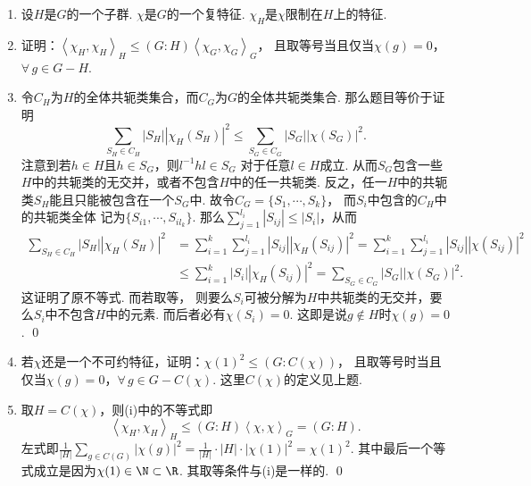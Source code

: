 \begin{enumerate}
        \item[11.8] 设$H$是$G$的一个子群. $\chi$是$G$的一个复特征.
        $\chi_{H}$是$\chi$限制在$H$上的特征.
        \item[(i)] 证明：$\left<\chi_{H},\chi_{H}\right>_{H} 
            \leq (G:H)\left<\chi_{G},\chi_{G}\right>_{G}$，
            且取等号当且仅当$\chi(g)=0$，$\forall \, g \in G-H$.
        \item[\textbf{证明:}]
            令$C_{H}$为$H$的全体共轭类集合，而$C_{G}$为$G$的全体共轭类集合.
            那么题目等价于证明
            \[\sum_{S_{H} \in C_{H}}|S_{H}||\chi_{H}(S_{H})|^{2} 
            \leq \sum_{S_{G} \in C_{G}}|S_{G}||\chi(S_{G})|^{2}.\]
            注意到若$h \in H$且$h \in S_{G}$，则$l^{-1}hl \in S_{G}$
            对于任意$l \in H$成立.
            从而$S_{G}$包含一些$H$中的共轭类的无交并，或者不包含$H$中的任一共轭类. 
            反之，任一$H$中的共轭类$S_{H}$能且只能被包含在一个$S_{G}$中.
            故令$C_{G}=\{S_{1},\cdots,S_{k}\}$，
            而$S_{i}$中包含的$C_{H}$中的共轭类全体
            记为$\{S_{i1},\cdots,S_{il_{k}}\}$.
            那么$\sum\limits_{j=1}^{l_{i}}|S_{ij}| \leq |S_{i}|$，从而
            \begin{equation*}\begin{aligned}
                \sum_{S_{H} \in C_{H}}|S_{H}||\chi_{H}(S_{H})|^{2}
                &= \sum_{i=1}^{k}\sum_{j=1}^{l_{i}}|S_{ij}||\chi_{H}(S_{ij})|^{2}
                = \sum_{i=1}^{k}\sum_{j=1}^{l_{i}}|S_{ij}||\chi(S_{ij})|^{2} \\
                &\leq \sum_{i=1}^{k}|S_{i}||\chi_{H}(S_{ij})|^{2}
                = \sum_{S_{G} \in C_{G}}|S_{G}||\chi(S_{G})|^{2}.
            \end{aligned}\end{equation*} 
            这证明了原不等式.
            而若取等，
            则要么$S_{i}$可被分解为$H$中共轭类的无交并，要么$S_{i}$中不包含$H$中的元素.
            而后者必有$\chi(S_{i})=0$. 这即是说$g \notin H$时$\chi(g)=0$. \qed

        \item[(ii)] 
            若$\chi$还是一个不可约特征，证明：$\chi(1)^{2} \leq (G:C(\chi))$，
            且取等号时当且仅当$\chi(g)=0$，$\forall \, g \in G - C(\chi)$.
            这里$C(\chi)$的定义见上题.
        \item[\textbf{证明:}]
            取$H = C(\chi)$，则(i)中的不等式即
            \[\left<\chi_{H},\chi_{H}\right>_{H} 
            \leq (G:H)\left<\chi,\chi\right>_{G}
            = (G:H).\]
            左式即$\frac{1}{|H|}\sum\limits_{g \in C(G)}|\chi(g)|^{2} 
            = \frac{1}{|H|} \cdot |H| \cdot |\chi(1)|^{2} = \chi(1)^{2}$.
            其中最后一个等式成立是因为$\chi(1) \in \N \subset \R$.
            其取等条件与(i)是一样的. \qed


\end{enumerate}
